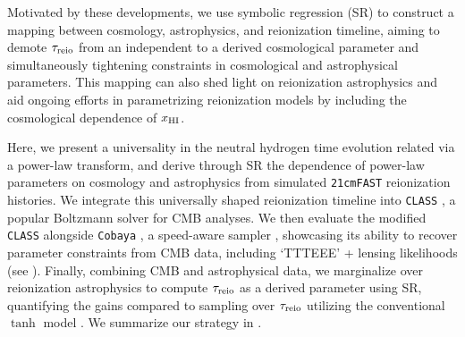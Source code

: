 Motivated by these developments, we use symbolic regression (SR)
\cite{Cranmer2023} to construct a mapping between cosmology,
astrophysics, and reionization timeline, aiming to demote $\tau_{\mathrm{reio}}$
from an independent to a derived cosmological parameter and
simultaneously tightening constraints in cosmological and astrophysical
parameters.
This mapping can also shed light on reionization astrophysics and aid
ongoing efforts in parametrizing reionization models \cite{Trac2018,
Trac2022, Paoletti2024} by including the cosmological dependence of
$x_{\mathrm{HI}}$.

Here, we present a universality in the neutral hydrogen time evolution
related via a power-law transform, and derive through SR the
dependence of power-law parameters on cosmology and astrophysics from
simulated \texttt{21cmFAST} \cite{MesingerEtAl2011, Murray2020}
reionization histories.
We integrate this universally shaped reionization timeline into
\texttt{CLASS} \cite{Blas2011}, a popular Boltzmann solver for CMB
analyses.
We then evaluate the modified \texttt{CLASS} alongside \texttt{Cobaya}
\cite{Torrado2020}, a speed-aware sampler \cite{Lewis2002,
Lewis2013}, showcasing its ability to
recover parameter constraints from CMB data, including `TTTEEE' +
lensing likelihoods \cite{Planck2020c, Planck2020d} (see ).
Finally, combining CMB and astrophysical data, we marginalize over
reionization astrophysics to compute $\tau_{\mathrm{reio}}$ as a derived parameter
using SR, quantifying the gains compared to sampling over $\tau_{\mathrm{reio}}$
utilizing the conventional $\tanh$ model \cite{Lewis2008}.
We summarize our strategy in .

